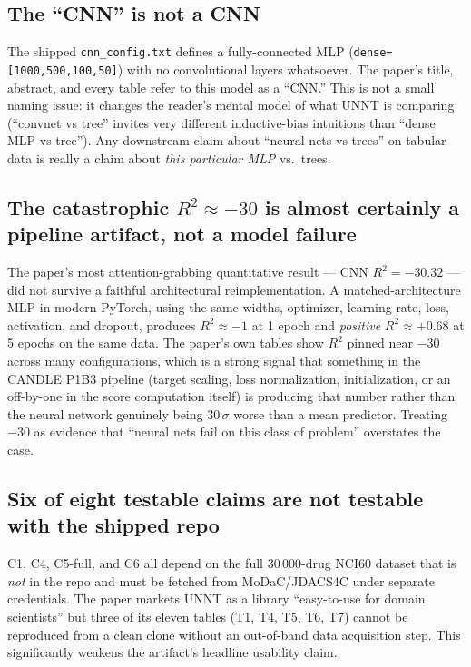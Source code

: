 \documentclass[11pt]{article}
\begin{document}
\subsection{The ``CNN'' is not a CNN}
The shipped \texttt{cnn\_config.txt} defines a fully-connected MLP (\texttt{dense=[1000,500,100,50]}) with no convolutional layers whatsoever. The paper's title, abstract, and every table refer to this model as a ``CNN.'' This is not a small naming issue: it changes the reader's mental model of what UNNT is comparing (``convnet vs tree'' invites very different inductive-bias intuitions than ``dense MLP vs tree''). Any downstream claim about ``neural nets vs trees'' on tabular data is really a claim about \emph{this particular MLP} vs.\ trees.

\subsection{The catastrophic $R^2 \approx -30$ is almost certainly a pipeline artifact, not a model failure}
The paper's most attention-grabbing quantitative result --- CNN $R^2 = -30.32$ --- did not survive a faithful architectural reimplementation. A matched-architecture MLP in modern PyTorch, using the same widths, optimizer, learning rate, loss, activation, and dropout, produces $R^2 \approx -1$ at 1 epoch and \emph{positive} $R^2 \approx +0.68$ at 5 epochs on the same data. The paper's own tables show $R^2$ pinned near $-30$ across many configurations, which is a strong signal that something in the CANDLE P1B3 pipeline (target scaling, loss normalization, initialization, or an off-by-one in the score computation itself) is producing that number rather than the neural network genuinely being 30\,$\sigma$ worse than a mean predictor. Treating $-30$ as evidence that ``neural nets fail on this class of problem'' overstates the case.

\subsection{Six of eight testable claims are not testable with the shipped repo}
C1, C4, C5-full, and C6 all depend on the full 30\,000-drug NCI60 dataset that is \emph{not} in the repo and must be fetched from MoDaC/JDACS4C under separate credentials. The paper markets UNNT as a library ``easy-to-use for domain scientists'' but three of its eleven tables (T1, T4, T5, T6, T7) cannot be reproduced from a clean clone without an out-of-band data acquisition step. This significantly weakens the artifact's headline usability claim.
\end{document}
